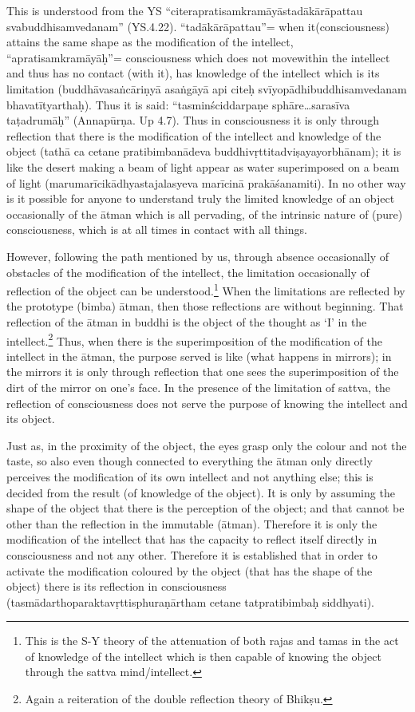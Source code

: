 This is understood from the YS “citerapratisamkramāyāstadākārāpattau svabuddhisamvedanam” (YS.4.22). “tadākārāpattau”= when it\break (consciousness) attains the same shape as the modification of the intellect, “apratisamkramāyāḥ”= consciousness which does not move\break within the intellect and thus has no contact (with it), has knowledge of the intellect which is its limitation (buddhāvasaṅcāriṇyā asaṅgāyā api citeḥ svīyopādhibuddhisamvedanam bhavatītyarthaḥ). Thus it is said: “tasminściddarpaṇe sphāre…sarasīva taṭadrumāḥ” (Annapūrṇa. Up 4.7). Thus in consciousness it is only through reflection that there is the modification of the intellect and knowledge of the object (tathā ca cetane pratibimbanādeva buddhivṛttitadviṣayayorbhānam); it is like the desert making a beam of light appear as water superimposed on a beam of light (marumarīcikādhyastajalasyeva marīcinā prakāśanamiti). In no other way is it possible for anyone to understand truly the limited knowledge of an object occasionally of the ātman which is all pervading, of the intrinsic nature of (pure) consciousness, which is at all times in contact with all things. 

However, following the path mentioned by us, through absence occasionally of obstacles of the modification of the intellect, the limitation occasionally of reflection of the object can be understood.\footnote{This is the S-Y theory of the attenuation of both rajas and tamas in the act of knowledge of the intellect which is then capable of knowing the object through the sattva mind/intellect.} When the limitations are reflected by the prototype (bimba) ātman, then those reflections are without beginning. That reflection of the ātman in buddhi is the object of the thought as ‘I’ in the intellect.\footnote{Again a reiteration of the double reflection theory of Bhikṣu.}  Thus, when there is the superimposition of the modification of the intellect in the ātman, the purpose served is like (what happens in mirrors);  in the mirrors it is only through reflection that one sees the superimposition of the dirt of the mirror on one’s face. In the presence of the limitation of sattva, the reflection of consciousness does not serve the purpose of knowing the intellect and its object.

Just as, in the proximity of the object, the eyes grasp only the colour and not the taste, so also even though connected to everything the ātman only directly perceives the modification of its own intellect and not anything else; this is decided from the result (of knowledge of the object). It is only by assuming the shape of the object that there is the perception of the object; and that cannot be other than the reflection in the immutable (ātman). Therefore it is only the modification of the intellect that has the capacity to reflect itself directly in consciousness and not any other. Therefore it is established that in order to activate the modification coloured by the object (that has the shape of the object) there is its reflection in consciousness  (tasmādarthoparaktavṛttisphuraṇārtham cetane tatpratibimbaḥ siddhyati).

